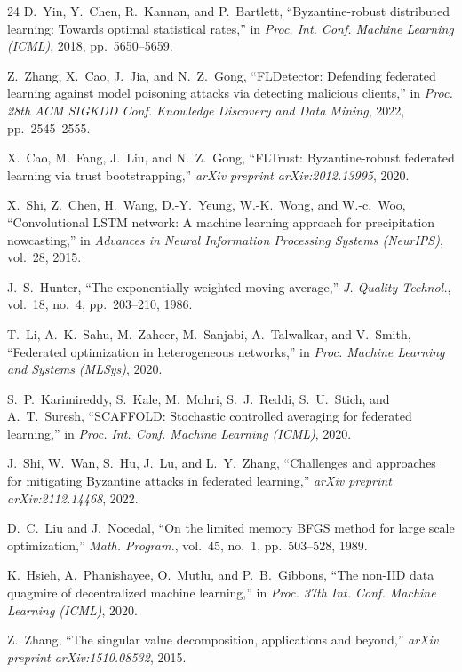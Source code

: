 \documentclass[journal]{IEEEtran}
\begin{document}
\begin{thebibliography}{24}
D.~Yin, Y.~Chen, R.~Kannan, and P.~Bartlett, ``Byzantine-robust distributed learning: Towards optimal statistical rates,'' in \textit{Proc. Int. Conf. Machine Learning (ICML)}, 2018, pp.~5650--5659.

Z.~Zhang, X.~Cao, J.~Jia, and N.~Z.~Gong, ``FLDetector: Defending federated learning against model poisoning attacks via detecting malicious clients,'' in \textit{Proc. 28th ACM SIGKDD Conf. Knowledge Discovery and Data Mining}, 2022, pp.~2545--2555.

X.~Cao, M.~Fang, J.~Liu, and N.~Z.~Gong, ``FLTrust: Byzantine-robust federated learning via trust bootstrapping,'' \textit{arXiv preprint arXiv:2012.13995}, 2020.

X.~Shi, Z.~Chen, H.~Wang, D.-Y.~Yeung, W.-K.~Wong, and W.-c.~Woo, ``Convolutional LSTM network: A machine learning approach for precipitation nowcasting,'' in \textit{Advances in Neural Information Processing Systems (NeurIPS)}, vol.~28, 2015.

J.~S.~Hunter, ``The exponentially weighted moving average,'' \textit{J. Quality Technol.}, vol.~18, no.~4, pp.~203--210, 1986.

T.~Li, A.~K.~Sahu, M.~Zaheer, M.~Sanjabi, A.~Talwalkar, and V.~Smith, ``Federated optimization in heterogeneous networks,'' in \textit{Proc. Machine Learning and Systems (MLSys)}, 2020.

S.~P.~Karimireddy, S.~Kale, M.~Mohri, S.~J.~Reddi, S.~U.~Stich, and A.~T.~Suresh, ``SCAFFOLD: Stochastic controlled averaging for federated learning,'' in \textit{Proc. Int. Conf. Machine Learning (ICML)}, 2020.

J.~Shi, W.~Wan, S.~Hu, J.~Lu, and L.~Y.~Zhang, ``Challenges and approaches for mitigating Byzantine attacks in federated learning,'' \textit{arXiv preprint arXiv:2112.14468}, 2022.

D.~C.~Liu and J.~Nocedal, ``On the limited memory BFGS method for large scale optimization,'' \textit{Math. Program.}, vol.~45, no.~1, pp.~503--528, 1989.

K.~Hsieh, A.~Phanishayee, O.~Mutlu, and P.~B.~Gibbons, ``The non-IID data quagmire of decentralized machine learning,'' in \textit{Proc. 37th Int. Conf. Machine Learning (ICML)}, 2020.

Z.~Zhang, ``The singular value decomposition, applications and beyond,'' \textit{arXiv preprint arXiv:1510.08532}, 2015.


\end{thebibliography}
\end{document}
